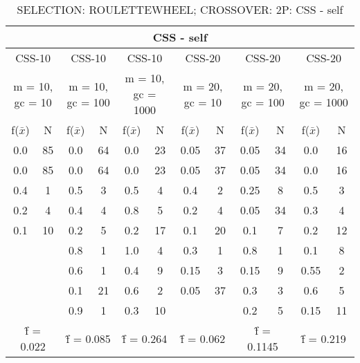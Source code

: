 \begin{table}[H]
	\centering
	\caption{SELECTION: ROULETTEWHEEL; CROSSOVER: 2P: CSS - self}
	\begin{adjustbox}{width=1\textwidth}
		\begin{tabular}{ |c|c||c|c||c|c||c|c||c|c||c|c| }
			\hline
			\multicolumn{12}{|c|}{CSS - self} \\
			\hline
			\multicolumn{2}{|c||}{CSS-10} & \multicolumn{2}{c||}{CSS-10} & \multicolumn{2}{c||}{CSS-10} & \multicolumn{2}{c||}{CSS-20} & \multicolumn{2}{c||}{CSS-20} & \multicolumn{2}{c|}{CSS-20}\\
			\hline
			\multicolumn{2}{|c||}{m = 10, gc = 10} & \multicolumn{2}{c||}{m = 10, gc = 100} & \multicolumn{2}{c||}{m = 10, gc = 1000} & \multicolumn{2}{c||}{m = 20, gc = 10} & \multicolumn{2}{c||}{m = 20, gc = 100} & \multicolumn{2}{c|}{m = 20, gc = 1000}\\
			\hline
			f($\bar{x}$) & N & f($\bar{x}$) & N & f($\bar{x}$) & N & f($\bar{x}$) & N & f($\bar{x}$) & N & f($\bar{x}$) & N\\
			\hline
			\hline
			0.0 & 85 & 0.0 & 64 & 0.0 & 23 & 0.05 & 37 & 0.05 & 34 & 0.0 & 16\\
			\hline
			0.0 & 85 & 0.0 & 64 & 0.0 & 23 & 0.05 & 37 & 0.05 & 34 & 0.0 & 16\\
			0.4 & 1 & 0.5 & 3 & 0.5 & 4 & 0.4 & 2 & 0.25 & 8 & 0.5 & 3\\
			0.2 & 4 & 0.4 & 4 & 0.8 & 5 & 0.2 & 4 & 0.05 & 34 & 0.3 & 4\\
			0.1 & 10 & 0.2 & 5 & 0.2 & 17 & 0.1 & 20 & 0.1 & 7 & 0.2 & 12\\
			&   & 0.8 & 1 & 1.0 & 4 & 0.3 & 1 & 0.8 & 1 & 0.1 & 8\\
			&   & 0.6 & 1 & 0.4 & 9 & 0.15 & 3 & 0.15 & 9 & 0.55 & 2\\
			&   & 0.1 & 21 & 0.6 & 2 & 0.05 & 37 & 0.3 & 3 & 0.6 & 5\\
			&   & 0.9 & 1 & 0.3 & 10 &   &   & 0.2 & 5 & 0.15 & 11\\
			\hline
			\multicolumn{2}{|c||}{\^{f} = 0.022} & \multicolumn{2}{c||}{\^{f} = 0.085} & \multicolumn{2}{c||}{\^{f} = 0.264} & \multicolumn{2}{c||}{\^{f} = 0.062} & \multicolumn{2}{c||}{\^{f} = 0.1145} & \multicolumn{2}{c|}{\^{f} = 0.219}\\
			\hline
		\end{tabular}
	\end{adjustbox}
\end{table}
